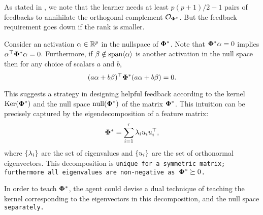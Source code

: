 \iffalse
As stated in , we note that the learner needs at least $p(p+1)/2 - 1$ pairs of feedbacks to annihilate the orthogonal complement $\mathcal{O}_{\boldsymbol{\Phi}^*}$. But the feedback requirement goes down if the rank is smaller. 

Consider an activation $\alpha \in \mathbb{R}^p$ in the nullspace of $\boldsymbol{\Phi}^*$. Note that $\boldsymbol{\Phi}^*\alpha = 0$ implies $\alpha^\top \boldsymbol{\Phi}^* \alpha = 0$. Furthermore, if $\beta \notin \text{span}\langle{\alpha}\rangle$ is another activation in the null space then for any choice of scalars $a$ and $b$, 
$$(a\alpha + b\beta)^\top\boldsymbol{\Phi}^*(a\alpha + b\beta) = 0.$$

This suggests a strategy in designing helpful feedback according to the kernel $\mathrm{Ker}({\boldsymbol{\Phi}^*})$ and the null space $\mathrm{null}({\boldsymbol{\Phi}^*})$ of the matrix $\boldsymbol{\Phi}^*$. 
This intuition can be precisely captured by the eigendecomposition of a feature matrix:
\begin{align}
    \boldsymbol{\Phi}^* = \sum_{i = 1}^r \lambda_i u_iu_i^\top, \label{eq: eigen}
\end{align}
where $\left\{\lambda_i\right\}$ are the set of eigenvalues and $\left\{u_i\right\}$ are the set of orthonormal eigenvectors. This decomposition is \tt{unique} for a symmetric matrix; furthermore all eigenvalues are non-negative as $\boldsymbol{\Phi}^* \succeq 0$.

In order to teach $\boldsymbol{\Phi}^*$, the agent could devise a dual technique of teaching the kernel corresponding to the eigenvectors in this decomposition, and the null space \tt{separately}.


